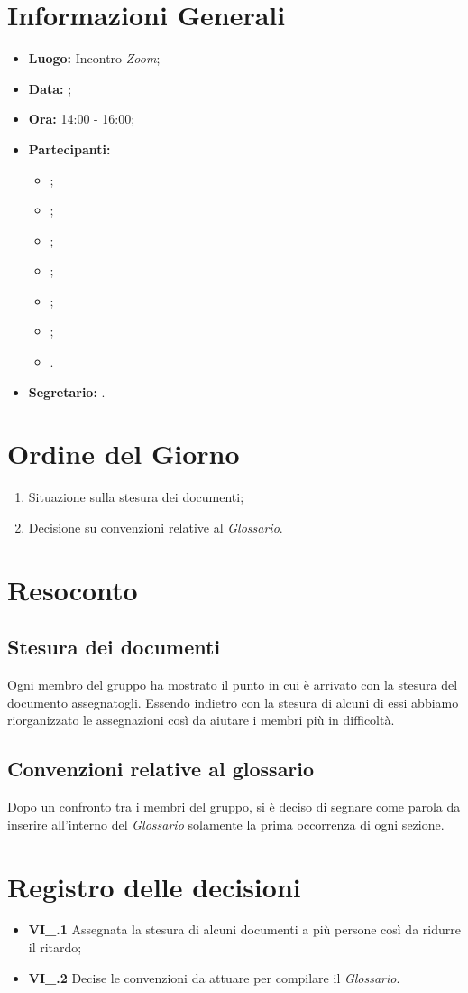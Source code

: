 \section{Informazioni Generali}
\begin{itemize}
\item \textbf{Luogo:} Incontro \textit{Zoom};
\item \textbf{Data:} \Data;
\item \textbf{Ora:} 14:00 - 16:00;
\item \textbf{Partecipanti:}
	\begin{itemize}
		\item \BL{}; 
		\item \FF{};
		\item \MM{}; 
		\item \PC{};
		\item \TG{};
		\item \TL{};
		\item \VD{}.
	\end{itemize} 
\item \textbf{Segretario:} \PC{}.
\end{itemize}

\section{Ordine del Giorno}
\begin{enumerate}
 \item Situazione sulla stesura dei documenti;
 \item Decisione su convenzioni relative al \textit{Glossario}.
\end{enumerate}

\section{Resoconto}
\subsection{Stesura dei documenti}
Ogni membro del gruppo ha mostrato il punto in cui è arrivato con la stesura del documento assegnatogli. Essendo indietro con la stesura di alcuni di essi abbiamo riorganizzato le assegnazioni così da aiutare i membri più in difficoltà.

\subsection{Convenzioni relative al glossario}
Dopo un confronto tra i membri del gruppo, si è deciso di segnare come parola da inserire all'interno del \textit{Glossario} solamente la prima occorrenza di ogni sezione.

\section{Registro delle decisioni}
\begin{itemize}
  \item \textbf{VI\_\Data.1} Assegnata la stesura di alcuni documenti a più persone così da ridurre il ritardo;
  \item \textbf{VI\_\Data.2} Decise le convenzioni da attuare per compilare il \textit{Glossario}.
\end{itemize}
